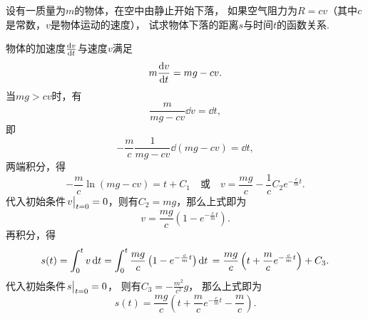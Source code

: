 \begin{example}
设有一质量为\(m\)的物体，在空中由静止开始下落，
如果空气阻力为\(R = cv\)（其中\(c\)是常数，\(v\)是物体运动的速度），
试求物体下落的距离\(s\)与时间\(t\)的函数关系.
\begin{solution}
物体的加速度\(\dv{v}{t}\)与速度\(v\)满足\begin{equation*}
	m \dv{v}{t} = mg - cv.
\end{equation*}
当\(mg>cv\)时，有\begin{equation*}
	\frac{m}{mg-cv} \dd{v} = \dd{t},
\end{equation*}
即\begin{equation*}
	-\frac{m}{c} \frac{1}{mg-cv} \dd(mg-cv) = \dd{t},
\end{equation*}
两端积分，得\begin{equation*}
	-\frac{m}{c} \ln(mg-cv) = t + C_1
	\quad\text{或}\quad
	v = \frac{mg}{c} - \frac{1}{c} C_2 e^{-\frac{c}{m} t}.
\end{equation*}
代入初始条件\(\eval{v}_{t=0} = 0\)，则有\(C_2 = mg\)，那么上式即为\begin{equation*}
	v = \frac{mg}{c} \left( 1 - e^{-\frac{c}{m} t} \right).
\end{equation*}
再积分，得\begin{equation*}
	s(t) = \int_0^t v \dd{t}
	= \int_0^t \frac{mg}{c} \left( 1 - e^{-\frac{c}{m} t} \right) \dd{t} \\
	= \frac{mg}{c} \left( t + \frac{m}{c} e^{-\frac{c}{m} t} \right) + C_3.
\end{equation*}
代入初始条件\(\eval{s}_{t=0} = 0\)，
则有\(C_3 = -\frac{m^2}{c^2} g\)，
那么上式即为\begin{equation*}
	s(t) = \frac{mg}{c} \left( t + \frac{m}{c} e^{-\frac{c}{m} t} - \frac{m}{c} \right).
\end{equation*}
\end{solution}
\end{example}

